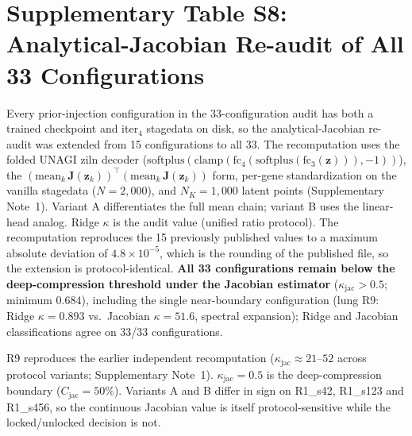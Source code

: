 \documentclass[11pt,a4paper]{article}
\begin{document}
\section*{Supplementary Table S8: Analytical-Jacobian Re-audit of All 33 Configurations}
\label{tab:s8_jacobian_audit}

\begin{sloppypar}
Every prior-injection configuration in the 33-configuration audit has both a trained checkpoint and iter$_4$ stagedata on disk, so the analytical-Jacobian re-audit was extended from 15 configurations to all 33. The recomputation uses the folded UNAGI ziln decoder ($\mathrm{softplus}(\mathrm{clamp}(\mathrm{fc}_4(\mathrm{softplus}(\mathrm{fc}_3(\mathbf{z}))),-1))$), the $(\mathrm{mean}_k\,\mathbf{J}(\mathbf{z}_k))^\top(\mathrm{mean}_k\,\mathbf{J}(\mathbf{z}_k))$ form, per-gene standardization on the vanilla stagedata ($N=2{,}000$), and $N_K=1{,}000$ latent points (Supplementary Note~1). Variant A differentiates the full mean chain; variant B uses the linear-head analog. Ridge $\kappa$ is the audit value (unified ratio protocol). The recomputation reproduces the 15 previously published values to a maximum absolute deviation of $4.8\times10^{-5}$, which is the rounding of the published file, so the extension is protocol-identical. \textbf{All 33 configurations remain below the deep-compression threshold under the Jacobian estimator} ($\kappa_{\mathrm{jac}}>0.5$; minimum $0.684$), including the single near-boundary configuration (lung R9: Ridge $\kappa=0.893$ vs.\ Jacobian $\kappa=51.6$, spectral expansion); Ridge and Jacobian classifications agree on 33/33 configurations.
\end{sloppypar}

\begin{center}

\end{center}

\vspace{2pt}

R9 reproduces the earlier independent recomputation ($\kappa_{\mathrm{jac}}\approx21$--$52$ across protocol variants; Supplementary Note~1). $\kappa_{\mathrm{jac}}=0.5$ is the deep-compression boundary ($C_{\mathrm{jac}}=50\%$). Variants A and B differ in sign on R1\_s42, R1\_s123 and R1\_s456, so the continuous Jacobian value is itself protocol-sensitive while the locked/unlocked decision is not.
\end{document}
